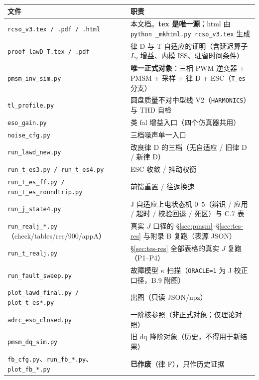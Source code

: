 \documentclass[11pt,a4paper]{article}
\theoremstyle{remark}\newtheorem{remark}{注}
\begin{document}
\begin{center}\footnotesize
\begin{tabular}{@{}p{5.2cm}p{9.6cm}@{}}
\toprule
文件 & 职责\\
\midrule
\texttt{rcso\_v3.tex / .pdf / .html} & 本文档。\textbf{tex 是唯一源}；html 由 \texttt{python \_mkhtml.py rcso\_v3.tex} 生成\\
\texttt{proof\_lawD\_T.tex / .pdf} & 律 D 与 T 自适应的证明（含延迟算子 $L_2$ 增益、内模 ISS、驻留时间条件）\\
\texttt{pmsm\_inv\_sim.py} & \textbf{唯一正式对象}：三相 PWM 逆变器 + PMSM + 采样 + 律 D + ESC（\texttt{T\_es} 分支）\\
\texttt{tl\_profile.py} & 圆盘质量不对中型线 V2（\texttt{HARMONICS}）与 THD 自检\\
\texttt{eso\_gain.py} & 类 fal 增益入口（四个仿真器共用）\\
\texttt{noise\_cfg.py} & 三档噪声单一入口\\
\texttt{run\_lawd\_new.py} & 改良律 D 的三档（无自适应 / 旧律 D / 新律 D）\\
\texttt{run\_t\_es3.py / run\_t\_es4.py} & ESC 收敛 / 抖动权衡\\
\texttt{run\_t\_es\_ff.py / run\_t\_es\_roundtrip.py} & 前馈重置 / 往返换速\\
\texttt{run\_j\_state4.py} & J 自适应上电状态机 $0$--$5$（辨识 / 应用 / 超时 / 校验回退 / 死区）与 C.7 表\\
\texttt{run\_realj\_*.py}（check/tables/rec/900/appA） & 真实 $J$ 口径的 §\ref{sec:pmsm}--§\ref{sec:tes-res} 与附录 B 复跑（表源 JSON）\\
\texttt{run\_t\_realj.py} & §\ref{sec:tes-res} 全部表格的真实 $J$ 复跑（P1--P4）\\
\texttt{run\_fault\_sweep.py} & 故障模型 $\kappa$ 扫描（\texttt{ORACLE=1} 为 J 校正口径，B.9 附图）\\
\texttt{plot\_lawd\_final.py / plot\_t\_es*.py} & 出图（只读 JSON/npz）\\
\midrule
\texttt{adrc\_eso\_closed.py} & 一阶核参照（非正式对象；仅理论对照）\\
\texttt{pmsm\_dq\_sim.py} & 旧 dq 降阶对象（历史，不得用于新结果）\\
\texttt{fb\_cfg.py}、\texttt{run\_fb\_*.py}、\texttt{plot\_fb\_*.py} & \textbf{已作废}（律 F），只作历史证据\\
\bottomrule
\end{tabular}
\end{center}
\end{document}
